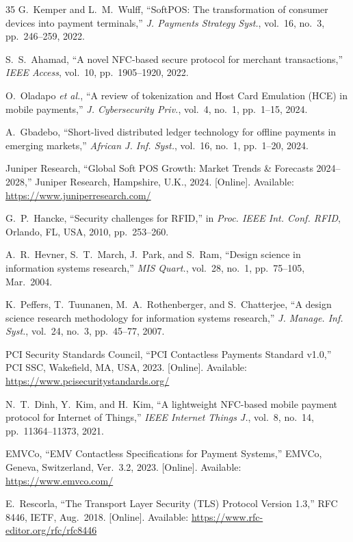\documentclass[conference,10pt]{IEEEtran}
\begin{document}
\begin{thebibliography}{35}
G.~Kemper and L.~M.~Wulff, ``SoftPOS: The transformation of consumer devices into payment terminals,'' \emph{J. Payments Strategy Syst.}, vol.~16, no.~3, pp.~246--259, 2022.

S.~S.~Ahamad, ``A novel NFC-based secure protocol for merchant transactions,'' \emph{IEEE Access}, vol.~10, pp.~1905--1920, 2022.

O.~Oladapo \emph{et al.}, ``A review of tokenization and Host Card Emulation (HCE) in mobile payments,'' \emph{J. Cybersecurity Priv.}, vol.~4, no.~1, pp.~1--15, 2024.

A.~Gbadebo, ``Short-lived distributed ledger technology for offline payments in emerging markets,'' \emph{African J. Inf. Syst.}, vol.~16, no.~1, pp.~1--20, 2024.

Juniper Research, ``Global Soft POS Growth: Market Trends \& Forecasts 2024--2028,'' Juniper Research, Hampshire, U.K., 2024. [Online]. Available: \url{https://www.juniperresearch.com/}

G.~P.~Hancke, ``Security challenges for RFID,'' in \emph{Proc. IEEE Int. Conf. RFID}, Orlando, FL, USA, 2010, pp.~253--260.

A.~R.~Hevner, S.~T.~March, J.~Park, and S.~Ram, ``Design science in information systems research,'' \emph{MIS Quart.}, vol.~28, no.~1, pp.~75--105, Mar.~2004.

K.~Peffers, T.~Tuunanen, M.~A.~Rothenberger, and S.~Chatterjee, ``A design science research methodology for information systems research,'' \emph{J. Manage. Inf. Syst.}, vol.~24, no.~3, pp.~45--77, 2007.

PCI Security Standards Council, ``PCI Contactless Payments Standard v1.0,'' PCI SSC, Wakefield, MA, USA, 2023. [Online]. Available: \url{https://www.pcisecuritystandards.org/}

N.~T.~Dinh, Y.~Kim, and H.~Kim, ``A lightweight NFC-based mobile payment protocol for Internet of Things,'' \emph{IEEE Internet Things J.}, vol.~8, no.~14, pp.~11364--11373, 2021.

EMVCo, ``EMV Contactless Specifications for Payment Systems,'' EMVCo, Geneva, Switzerland, Ver.~3.2, 2023. [Online]. Available: \url{https://www.emvco.com/}

E.~Rescorla, ``The Transport Layer Security (TLS) Protocol Version 1.3,'' RFC 8446, IETF, Aug.~2018. [Online]. Available: \url{https://www.rfc-editor.org/rfc/rfc8446}


\end{thebibliography}
\end{document}
